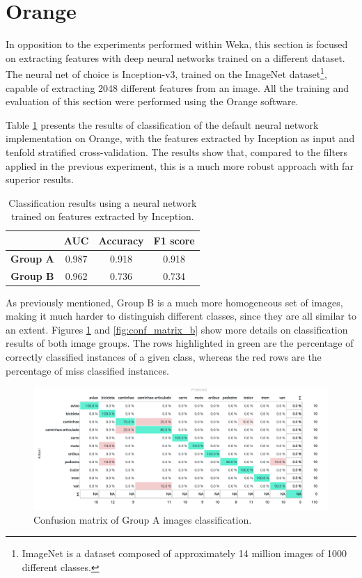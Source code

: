 \documentclass{article}
\begin{document}
\section*{Orange}

In opposition to the experiments performed within Weka, this section is focused on extracting features with deep neural networks trained on a different dataset. The neural net of choice is Inception-v3, trained on the ImageNet dataset\footnote{ImageNet is a dataset composed of approximately 14 million images of 1000 different classes.}, capable of extracting 2048 different features from an image. All the training and evaluation of this section were performed using the Orange software.

Table \ref{tab:inception_baseline} presents the results of classification of the default neural network implementation on Orange, with the features extracted by Inception as input and tenfold stratified cross-validation. The results show that, compared to the filters applied in the previous experiment, this is a much more robust approach with far superior results.

\begin{table}[htbp]
    \centering
    \begin{tabular}{c|c|c|c}
         & \textbf{AUC} & \textbf{Accuracy} & \textbf{F1 score}  \\ \hline
         \textbf{Group A} & 0.987 & 0.918 & 0.918 \\
         \textbf{Group B} & 0.962 & 0.736 & 0.734 \\
    \end{tabular}
    \caption{Classification results using a neural network trained on features extracted by Inception.}
    \label{tab:inception_baseline}
\end{table}

As previously mentioned, Group B is a much more homogeneous set of images, making it much harder to distinguish different classes, since they are all similar to an extent.
Figures \ref{fig:conf_matrix_a} and \ref{fig:conf_matrix_b} show more details on classification results of both image groups. The rows highlighted in green are the percentage of correctly classified instances of a given class, whereas the red rows are the percentage of miss classified instances.

\begin{figure}[htbp]
    \centering
    \includegraphics[scale=0.52]{cm_grpa.png}
    \caption{Confusion matrix of Group A images classification.}
    \label{fig:conf_matrix_a}
\end{figure}
\end{document}
